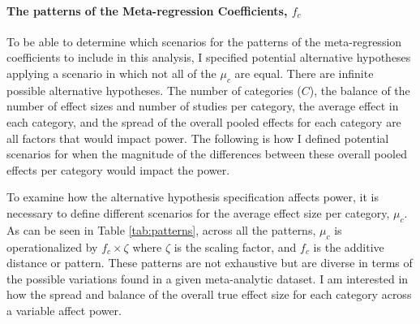 \paragraph{The patterns of the Meta-regression Coefficients, $f_c$} \label{sec: patterns}
To be able to determine which scenarios for the patterns of the meta-regression coefficients to include in this analysis, I specified potential alternative hypotheses applying a scenario in which not all of the $\mu_c$ are equal. There are infinite possible alternative hypotheses. The number of categories ($C$), the balance of the number of effect sizes and number of studies per category, the average effect in each category, and the spread of the overall pooled effects for each category are all factors that would impact power. The following is how I defined potential scenarios for when the magnitude of the differences between these overall pooled effects per category would impact the power.  

To examine how the alternative hypothesis specification affects power, it is necessary to define different scenarios for the average effect size per category, $\mu_c$. 
As can be seen in Table \ref{tab:patterns}, across all the patterns, $\mu_c$ is operationalized by $f_c \times \zeta$ where $\zeta$ is the scaling factor, and $f_c$ is the additive distance or pattern. These patterns are not exhaustive but are diverse in terms of the possible variations found in a given meta-analytic dataset. I am interested in how the spread and balance of the overall true effect size for each category across a variable affect power. 



